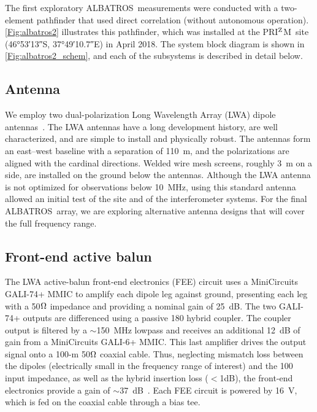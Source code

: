 \documentclass{ws-jai}
\def\albatros{ALBATROS}
\def\prizm{PRI$^{\rm Z}$M}
\begin{document}
The first exploratory \albatros\ measurements were conducted with a
two-element pathfinder that used direct correlation (without
autonomous operation).  \autoref{Fig:albatros2} illustrates this
pathfinder, which was installed at the \prizm\ site (\ang{46;53;13}S,
\ang{37;49;10.7}E) in April 2018.  The system block diagram is shown
in \autoref{Fig:albatros2_schem}, and each of the subsystems is
described in detail below.

\subsection{Antenna}\label{s:antenna}

We employ two dual-polarization Long Wavelength Array (LWA) dipole
antennas~\citep{Memo28}.  The LWA antennas have a long development
history, are well characterized, and are simple to install and
physically robust.  The antennas form an east--west baseline with a
separation of \SI{110}{m}, and the polarizations are aligned with the
cardinal directions.  Welded wire mesh screens, roughly 3~m on a side,
are installed on the ground below the antennas.  Although the LWA
antenna is not optimized for observations below 10~MHz, using this
standard antenna allowed an initial test of the site and of the
interferometer systems.  For the final \albatros\ array, we are
exploring alternative antenna designs that will cover the full
frequency range.


\subsection{Front-end active balun}\label{s:fee}

The LWA active-balun front-end electronics (FEE) circuit uses a
MiniCircuits GALI-74+ MMIC to amplify each dipole leg against ground,
presenting each leg with a 50$\ohm$ impedance and providing a nominal
gain of 25~dB. The two GALI-74+ outputs are differenced using a
passive {180\degree} hybrid coupler. The coupler output is filtered by
a $\sim$150~MHz lowpass and receives an additional 12~dB of gain from
a MiniCircuits GALI-6+ MMIC. This last amplifier drives the output
signal onto a 100-m 50$\ohm$ coaxial cable. Thus, neglecting mismatch
loss between the dipoles (electrically small in the frequency range of
interest) and the 100{\ohm} input impedance, as well as the hybrid
insertion loss ($<$1dB), the front-end electronics provide a gain of
$\sim$37~dB~\citep{2012PASP..124.1090H}.  Each FEE circuit is powered
by 16~V, which is fed on the coaxial cable through a bias tee.
\end{document}
